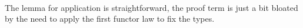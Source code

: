 \documentclass[preliminary,copyright,creativecommons]{eptcs}
\newenvironment{code}{\verbatim}{\endverbatim}
\begin{document}
\begin{samepage}
\begin{code}
\>[9]\<[12]\>[12]     \AgdaSymbol{(} \AgdaSymbol{(}  \AgdaSymbol{))}\<\\
\>     \AgdaSymbol{=}    \AgdaInductiveConstructor{,}  \AgdaInductiveConstructor{,}        \AgdaSymbol{(}  \AgdaSymbol{)}  \AgdaSymbol{(}   \AgdaSymbol{))}\<\end{code}
\end{samepage}

\noindent
The lemma for application is straightforward, the proof term is just a
bit bloated by the need to apply the first functor law 
to fix the types.
\end{document}
